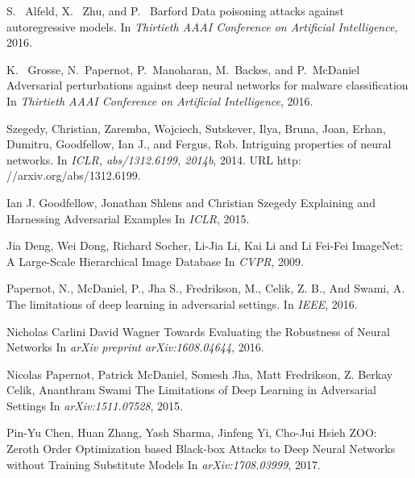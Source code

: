 \documentclass[12pt, conference, letterpaper]{IEEEtran}
\begin{document}
{{{{{{{{{{{{{{\begin{thebibliography}{10}
S. ~Alfeld, X. ~Zhu, and P. ~Barford
\newblock Data poisoning attacks against
autoregressive models.
\newblock In {\em Thirtieth AAAI Conference on Artificial
Intelligence}, 2016. \newline

K. ~Grosse, N.~Papernot, P.~Manoharan, M.~Backes, and P.~McDaniel
\newblock Adversarial perturbations against deep neural networks for malware
classification
\newblock In {\em Thirtieth AAAI Conference on Artificial
Intelligence}, 2016. \newline


Szegedy, Christian, Zaremba, Wojciech, Sutskever, Ilya, Bruna, Joan, Erhan, Dumitru, Goodfellow, Ian J., and Fergus, Rob.
\newblock  Intriguing properties of neural networks.
\newblock In {\em ICLR, abs/1312.6199, 2014b}, 2014. URL http: //arxiv.org/abs/1312.6199. \newline

Ian J. Goodfellow, Jonathan Shlens and Christian Szegedy
\newblock Explaining and Harnessing Adversarial Examples
\newblock In {\em ICLR}, 2015. \newline

Jia Deng, Wei Dong, Richard Socher, Li-Jia Li, Kai Li and Li Fei-Fei
\newblock ImageNet: A Large-Scale Hierarchical Image Database
\newblock In {\em CVPR}, 2009. \newline

Papernot, N., McDaniel, P., Jha S., Fredrikson, M., Celik, Z. B., And Swami, A.
\newblock The limitations of deep learning in adversarial settings. 
\newblock In {\em IEEE}, 2016. \newline

Nicholas Carlini David Wagner
\newblock Towards Evaluating the Robustness of Neural Networks
\newblock In {\em arXiv
preprint arXiv:1608.04644}, 2016. \newline

Nicolas Papernot, Patrick McDaniel, Somesh Jha, Matt Fredrikson, Z. Berkay Celik, Ananthram Swami
\newblock The Limitations of Deep Learning
in Adversarial Settings
\newblock In {\em	arXiv:1511.07528}, 2015. \newline

Pin-Yu Chen, Huan Zhang, Yash Sharma, Jinfeng Yi, Cho-Jui Hsieh
\newblock ZOO: Zeroth Order Optimization based Black-box Attacks to Deep Neural Networks without Training Substitute Models
\newblock In {\em		arXiv:1708.03999}, 2017. \newline


\end{thebibliography}}}}}}}}}}}}}}}
\end{document}

